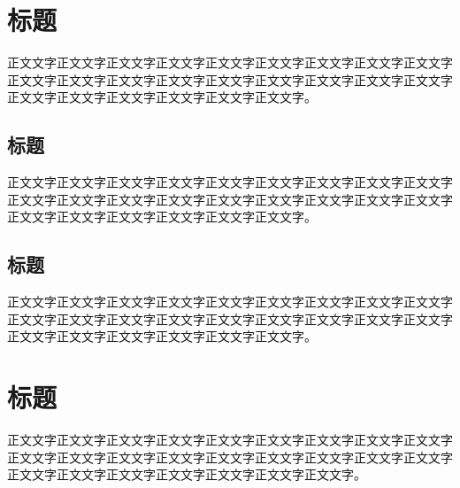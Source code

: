 \section{标题}
正文文字正文文字正文文字正文文字正文文字正文文字正文文字正文文字正文文字正文文字正文文字正文文字正文文字正文文字正文文字正文文字正文文字正文文字正文文字正文文字正文文字正文文字正文文字正文文字。

\subsection{标题}
正文文字正文文字正文文字正文文字正文文字正文文字正文文字正文文字正文文字正文文字正文文字正文文字正文文字正文文字正文文字正文文字正文文字正文文字正文文字正文文字正文文字正文文字正文文字正文文字。

\subsection{标题}
正文文字正文文字正文文字正文文字正文文字正文文字正文文字正文文字正文文字正文文字正文文字正文文字正文文字正文文字正文文字正文文字正文文字正文文字正文文字正文文字正文文字正文文字正文文字正文文字。

\section{标题}
正文文字正文文字正文文字正文文字正文文字正文文字正文文字正文文字正文文字正文文字正文文字正文文字正文文字正文文字正文文字正文文字正文文字正文文字正文文字正文文字正文文字正文文字正文文字正文文字正文文字。
